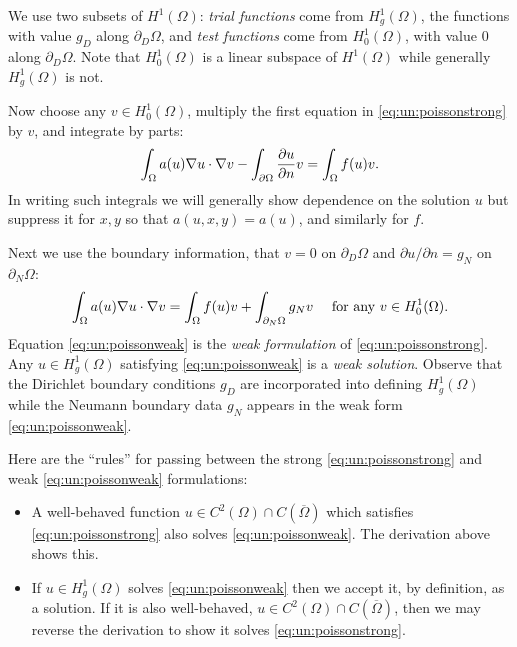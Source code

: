 We use two subsets of $H^1(\Omega)$: \emph{trial functions} come from $H_{g}^1(\Omega)$, the functions with value $g_D$ along $\partial_D \Omega$, and \emph{test functions} come from $H_{0}^1(\Omega)$, with value $0$ along $\partial_D \Omega$.  Note that $H_{0}^1(\Omega)$ is a linear subspace of $H^1(\Omega)$ while generally $H_{g}^1(\Omega)$ is not.

Now choose any $v\in H_{0}^1(\Omega)$, multiply the first equation in \eqref{eq:un:poissonstrong} by $v$, and integrate by parts:
\begin{equation*}
\int_\Omega a(u) \nabla u \cdot \nabla v - \int_{\partial\Omega} \frac{\partial u}{\partial n} v = \int_\Omega f(u) v.
\end{equation*}
In writing such integrals we will generally show dependence on the solution $u$ but suppress it for $x,y$ so that $a(u,x,y)=a(u)$, and similarly for $f$.

Next we use the boundary information, that $v=0$ on $\partial_D\Omega$ and $\partial u/\partial n=g_N$ on $\partial_N\Omega$:
\begin{equation}
\int_\Omega a(u) \nabla u \cdot \nabla v = \int_\Omega f(u) v + \int_{\partial_N\Omega} g_N v\quad \text{ for any } v\in H_{0}^1(\Omega). \label{eq:un:poissonweak}
\end{equation}
Equation \eqref{eq:un:poissonweak} is the \emph{weak formulation} of \eqref{eq:un:poissonstrong}.  Any $u \in H_{g}^1(\Omega)$ satisfying \eqref{eq:un:poissonweak} is a \emph{weak solution}.  Observe that the Dirichlet boundary conditions $g_D$ are incorporated into defining $H_{g}^1(\Omega)$ while the Neumann boundary data $g_N$ appears in the weak form \eqref{eq:un:poissonweak}.

Here are the ``rules'' for passing between the strong \eqref{eq:un:poissonstrong} and weak \eqref{eq:un:poissonweak} formulations:\begin{itemize}
\item A well-behaved function $u \in C^2(\Omega) \cap C(\overline \Omega)$ which satisfies \eqref{eq:un:poissonstrong} also solves \eqref{eq:un:poissonweak}.  The derivation above shows this.
\item If $u \in H_{g}^1(\Omega)$ solves \eqref{eq:un:poissonweak} then we accept it, by definition, as a solution.   If it is also well-behaved, $u \in C^2(\Omega) \cap C(\overline \Omega)$, then we may reverse the derivation to show it solves \eqref{eq:un:poissonstrong}.
\end{itemize}

